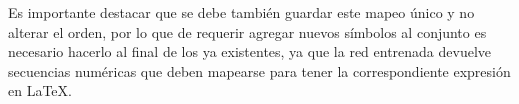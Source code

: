 


\newpage
Es importante destacar que se debe también guardar este mapeo único y no alterar el orden, por lo que de requerir agregar nuevos símbolos al conjunto es necesario hacerlo al final de los ya existentes, ya que la red entrenada devuelve secuencias numéricas que deben mapearse para tener la correspondiente expresión en \LaTeX{}.
